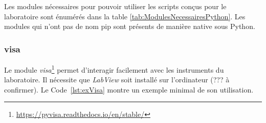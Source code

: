 \documentclass[11pt,francais]{book} %
\begin{document}
Les modules nécessaires pour pouvoir utiliser les scripts con\c{c}us pour le laboratoire sont énumérés dans la table \ref{tab:ModulesNecessairesPython}.
Les modules qui n'ont pas de nom pip sont présents de manière native sous Python.

\begin{table}[htbf]
  \caption{Modules nécessaires au fonctionnement des scripts du laboratoire}
  \label{tab:ModulesNecessairesPython}
  \centering
\end{table}

\subsubsection{visa}

Le module {\it visa}\footnote{\url{https://pyvisa.readthedocs.io/en/stable/}} permet d'interagir facilement avec les instruments du laboratoire.
Il nécessite que {\it LabView} soit installé sur l'ordinateur (??? à confirmer).
Le Code~\ref{lst:exVisa} montre un exemple minimal de son utilisation.
\end{document}
